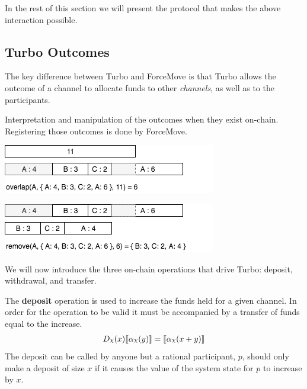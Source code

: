 \documentclass{article}
\DeclareRobustCommand{\rchi}{{\mathpalette\irchi\relax}}
\newcommand{\irchi}[2]{\raisebox{\depth}{$#1\chi$}} %
\theoremstyle{definition}
\newcommand{\adj}[1]{\llbracket #1 \rrbracket}
\begin{document}
In the rest of this section we will present the protocol that makes the above interaction
possible.

\subsection{Turbo Outcomes}

The key difference between Turbo and ForceMove is that Turbo allows the outcome of a channel to allocate funds to other \textit{channels}, as well as to the participants.


Interpretation and manipulation of the outcomes when they exist on-chain. Registering those
outcomes is done by ForceMove.

\begin{center}
  \includegraphics[scale=0.7]{overlap} %
\end{center}


\begin{center}
  \includegraphics[scale=0.7]{remove} %
\end{center}


We will now introduce the three on-chain operations that drive Turbo: deposit, withdrawal,
and transfer.


The \textbf{deposit} operation is used to increase the funds held for a given channel.
In order for the operation to be valid it must be accompanied by a transfer of funds equal 
to the increase.
\begin{align*}
D_\rchi(x) \adj{\alpha_\rchi(y)} = \adj{\alpha_\rchi(x + y)}
\end{align*}
The deposit can be called by anyone but a rational participant, $p$, should only make a
deposit of size $x$ if it causes the value of the system state for $p$ to increase by $x$.
\end{document}

